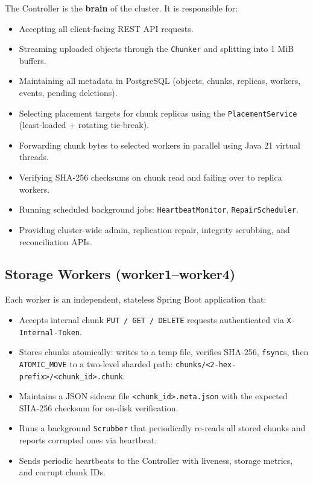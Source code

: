 \documentclass[12pt,a4paper]{report}
\begin{document}
The Controller is the \textbf{brain} of the cluster. It is responsible for:
\begin{itemize}
  \item Accepting all client-facing REST API requests.
  \item Streaming uploaded objects through the \texttt{Chunker} and splitting into 1 MiB buffers.
  \item Maintaining all metadata in PostgreSQL (objects, chunks, replicas, workers, events, pending deletions).
  \item Selecting placement targets for chunk replicas using the \texttt{PlacementService} (least-loaded + rotating tie-break).
  \item Forwarding chunk bytes to selected workers in parallel using Java 21 virtual threads.
  \item Verifying SHA-256 checksums on chunk read and failing over to replica workers.
  \item Running scheduled background jobs: \texttt{HeartbeatMonitor}, \texttt{RepairScheduler}.
  \item Providing cluster-wide admin, replication repair, integrity scrubbing, and reconciliation APIs.
\end{itemize}

\subsection{Storage Workers (worker1--worker4)}

Each worker is an independent, stateless Spring Boot application that:
\begin{itemize}
  \item Accepts internal chunk \texttt{PUT / GET / DELETE} requests authenticated via \texttt{X-Internal-Token}.
  \item Stores chunks atomically: writes to a temp file, verifies SHA-256, \texttt{fsync}s, then \texttt{ATOMIC\_MOVE} to a two-level sharded path: \texttt{chunks/<2-hex-prefix>/<chunk\_id>.chunk}.
  \item Maintains a JSON sidecar file \texttt{<chunk\_id>.meta.json} with the expected SHA-256 checksum for on-disk verification.
  \item Runs a background \texttt{Scrubber} that periodically re-reads all stored chunks and reports corrupted ones via heartbeat.
  \item Sends periodic heartbeats to the Controller with liveness, storage metrics, and corrupt chunk IDs.
\end{itemize}
\end{document}

